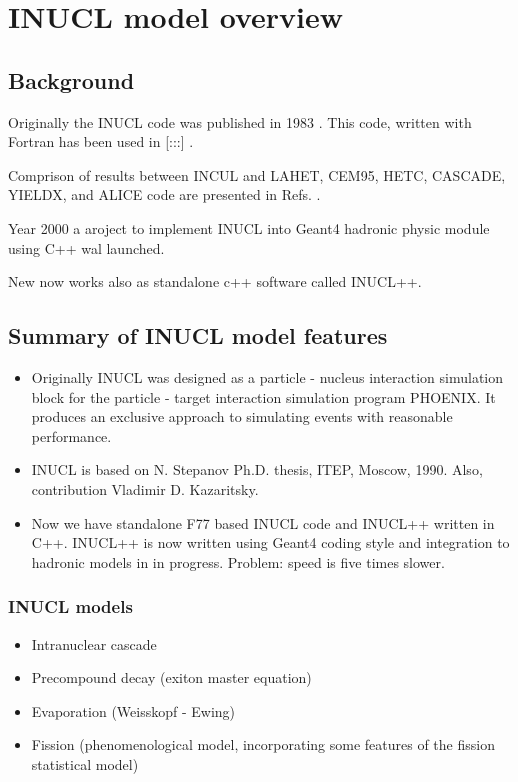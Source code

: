 
\section{INUCL model overview}

\subsection{Background}
Originally the INUCL code was published in 1983 \cite{stepanov}.
This code, written with Fortran has been used in [:::] \cite{:::}.

Comprison of results between INCUL and LAHET, CEM95, HETC, CASCADE,
YIELDX, and ALICE code are presented in Refs. \cite{titarenko99a}.

Year 2000 a aroject to implement INUCL into Geant4 hadronic physic
module using C++ wal launched. 

New now  works also as standalone c++ software called INUCL++.

\subsection{Summary of INUCL model features}
\begin{itemize}
\item Originally INUCL was designed as a particle - nucleus interaction simulation block for the particle - target interaction simulation program PHOENIX. It produces an exclusive approach to simulating events with reasonable performance.
\item INUCL is based on N. Stepanov Ph.D. thesis, ITEP, Moscow, 1990.
Also, contribution Vladimir D. Kazaritsky.
\item Now we have standalone F77 based INUCL code and INUCL++ written in C++.
INUCL++ is now written using Geant4 coding style and integration to hadronic models in in progress. Problem: speed is five times slower.
\end{itemize}

\subsubsection{INUCL models}
\begin{itemize}
\item Intranuclear cascade
\item Precompound decay (exiton master equation) 
\item Evaporation (Weisskopf - Ewing) 
\item Fission (phenomenological model, incorporating some features of the fission statistical model)
\end{itemize}

